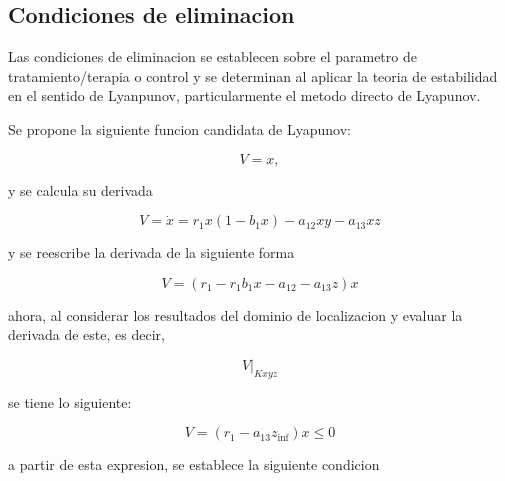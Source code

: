 \documentclass[letterpaper,11pt]{article}
\begin{document}
$\allowbreak $

\subsection{\protect\bigskip Condiciones de eliminacion}

\bigskip

Las condiciones de eliminacion se establecen sobre el parametro de
tratamiento/terapia o control y se determinan al aplicar la teoria de
estabilidad en el sentido de Lyanpunov, particularmente el metodo directo de
Lyapunov.

\bigskip

Se propone la siguiente funcion candidata de Lyapunov:

\bigskip

\begin{equation*}
V=x,
\end{equation*}

\bigskip

y se calcula su derivada

\bigskip

\begin{equation*}
V=\dot{x}=r_{1}x(1-b_{1}x)-a_{12}xy-a_{13}xz
\end{equation*}

\bigskip

y se reescribe la derivada de la siguiente forma

\bigskip

\begin{equation*}
V=\left( r_{1}-r_{1}b_{1}x-a_{12}-a_{13}z\right) x
\end{equation*}

\bigskip

ahora, al considerar los resultados del dominio de localizacion y evaluar la
derivada de este, es decir,

\bigskip

\begin{equation*}
\left. V\right\vert _{Kxyz}
\end{equation*}

\bigskip

se tiene lo siguiente:

\bigskip

\begin{equation*}
V=\left( r_{1}-a_{13}z_{\inf }\right) x\leq 0
\end{equation*}

a partir de esta expresion, se establece la siguiente condicion
\end{document}
